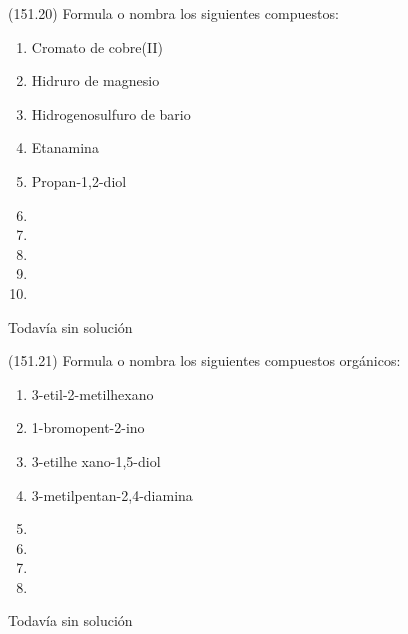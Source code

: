   \begin{exercise}[
      tags    = {},
      topics  = {química, química orgánica, orgánica},
      source  = {FQ 1B MGH 2016, p151, e20},
    ]
    (151.20) Formula o nombra los siguientes compuestos:
    \begin{enumerate}
      \item Cromato de cobre(II)
      \item Hidruro de magnesio
      \item Hidrogenosulfuro de bario
      \item Etanamina
      \item Propan-1,2-diol
      \item {}
      \item {}
      \item {}
      \item {}
      \item {}
    \end{enumerate}
  \end{exercise}

  \begin{solution}[print=false]
    Todavía sin solución
  \end{solution}




  \begin{exercise}[
      tags    = {},
      topics  = {química, química orgánica, orgánica},
      source  = {FQ 1B MGH 2016, p151, e21},
    ]
    (151.21) Formula o nombra los siguientes compuestos orgánicos:
    \begin{enumerate}
      \item 3-etil-2-metilhexano
      \item 1-bromopent-2-ino
      \item 3-etilhe xano-1,5-diol
      \item 3-metilpentan-2,4-diamina
      \item {}
      \item {}
      \item {}
      \item {}
    \end{enumerate}
  \end{exercise}

  \begin{solution}[print=false]
    Todavía sin solución
  \end{solution}






